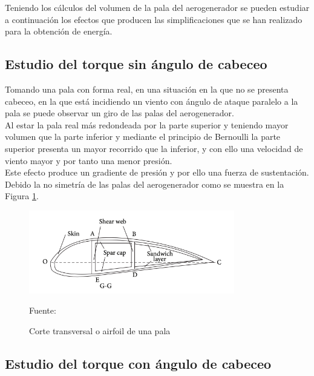 Teniendo los cálculos del volumen de la pala del aerogenerador se pueden estudiar a continuación los efectos que producen las simplificaciones que se han realizado para la obtención de energía.


\subsection{Estudio del torque sin ángulo de cabeceo}
\label{section:no_cabeceo}

Tomando una pala con forma real, en una situación en la que no se presenta cabeceo, en la que está incidiendo un viento con ángulo de ataque paralelo a la pala se puede observar un giro de las palas del aerogenerador.\\

Al estar la pala real más redondeada por la parte superior y teniendo mayor volumen que la parte inferior y mediante el principio de Bernoulli la parte superior presenta un mayor recorrido que la inferior, y con ello una velocidad de viento mayor y por tanto una menor presión. \\

Este efecto produce un gradiente de presión y por ello una fuerza de sustentación. Debido la no simetría de las palas del aerogenerador como se muestra en la Figura \ref{fig:corte_transversal_pala}. \\

    \begin{figure}[H]
    \centering
    \includegraphics[width=0.8\textwidth]{images/Cross secction pala articulo.png}
    \caption{Corte transversal o airfoil de una pala}
    Fuente: \cite{Zheng2014}
    \label{fig:corte_transversal_pala}
    \end{figure}





\subsection{Estudio del torque con ángulo de cabeceo}
\label{section:torque_giro_inicial}

